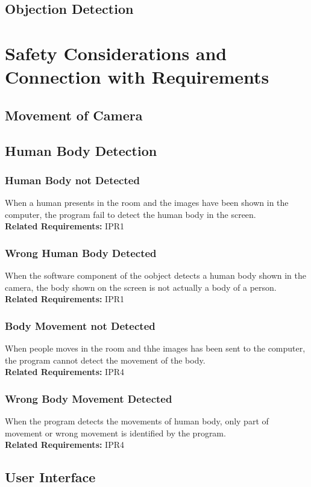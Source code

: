 \documentclass{article}
\begin{document}
\subsection{Objection Detection}

\section{Safety Considerations and Connection with Requirements}
\subsection{Movement of Camera}
\subsection{Human Body Detection}
\subsubsection{Human Body not Detected}
When a human presents in the room and the images have been shown in the computer, the program fail to detect the human body in the screen. \\
\textbf{Related Requirements: }IPR1
\subsubsection{Wrong Human Body Detected}
When the software component of the oobject detects a human body shown in the camera, the body shown on the screen is not actually a body of a person.\\
\textbf{Related Requirements: }IPR1
\subsubsection{Body Movement not Detected}
When people moves in the room and thhe images has been sent to the computer, the program cannot detect the movement of the body.\\
\textbf{Related Requirements: }IPR4
\subsubsection{Wrong Body Movement Detected}
When the program detects the movements of human body, only part of movement or wrong movement is identified by the program.\\
\textbf{Related Requirements: }IPR4
\subsection{User Interface}
\end{document}
